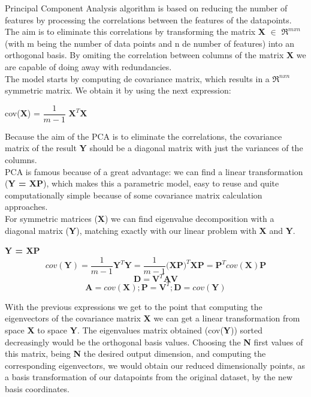 \documentclass[a4paper,11pt,spanish]{report}
\begin{document}
Principal Component Analysis algorithm is based on reducing the number of features by processing the correlations between the features of the datapoints. The aim is to eliminate this correlations by transforming the matrix \textbf{X} $\in$ $\Re^{mxn}$ (with m being the number of data points and n de number of features) into an orthogonal basis. By omiting the correlation between columns of the matrix \textbf{X} we are capable of doing away with redundancies.\\
The model starts by computing de covariance matrix, which results in a $\Re^{nxn}$ symmetric matrix. We obtain it by using the next expression:
\begin{center}
cov(\textbf{X}) = $\dfrac{1}{m-1}$ $\textbf{X}^{T}$\textbf{X}
\end{center}
Because the aim of the PCA is to eliminate the correlations, the covariance matrix of the result \textbf{Y} should be a diagonal matrix with just the variances of the columns.\\
PCA is famous because of a great advantage: we can find a linear transformation (\textbf{Y = XP}), which makes this a parametric model, easy to reuse and quite computationally simple because of some covariance matrix calculation approaches.\\
For symmetric matrices (\textbf{X}) we can find eigenvalue decomposition with a diagonal matrix (\textbf{Y}), matching exactly with our linear problem with \textbf{X} and \textbf{Y}.
\begin{center}
\textbf{Y = XP}
$$ cov(\textbf{Y}) = \frac{1}{m-1} \textbf{Y}^{T} \textbf{Y} = \frac{1}{m-1} \textbf{(XP)}^{T} \textbf{XP} = \textbf{P}^{T} cov(\textbf{X})\textbf{P} $$
$$\textbf{D} = \textbf{V}^{T} \textbf{AV}$$
$$ \textbf{A} = cov(\textbf{X}); \textbf{P} = \textbf{V}^{T}; \textbf{D} = cov(\textbf{Y})$$
\end{center}

With the previous expressions we get to the point that computing the eigenvectors of the covariance matrix \textbf{X} we can get a linear transformation from space \textbf{X} to space \textbf{Y}. The eigenvalues matrix obtained (cov(\textbf{Y})) sorted decreasingly would be the orthogonal basis values. Choosing the \textbf{N} first values of this matrix, being \textbf{N} the desired output dimension, and computing the corresponding eigenvectors, we would obtain our reduced dimensionally points, as a basis transformation of our datapoints from the original dataset, by the new basis coordinates.
\newpage
\end{document}
